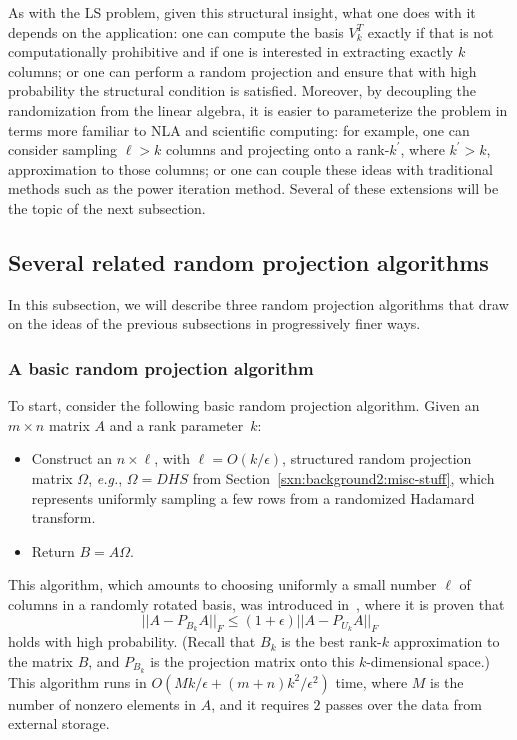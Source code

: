 \documentclass[twoside]{article}
\begin{document}
As with the LS problem, given this structural insight, what one does with 
it depends on the application:
one can compute the basis $V_k^T$ exactly if that is not computationally 
prohibitive and if one is interested in extracting exactly $k$ columns; or
one can perform a random projection and ensure that with high probability 
the structural condition is satisfied.
Moreover, by decoupling the randomization from the linear algebra, it is 
easier to parameterize the problem in terms more familiar to NLA and 
scientific computing: for example, one can consider sampling $\ell > k$ 
columns and projecting onto a rank-$k^\prime$, where $k^\prime > k$, 
approximation to those columns; or one can couple these ideas with 
traditional methods such as the power iteration method.
Several of these extensions will be the topic of the next subsection.


\subsection{Several related random projection algorithms}
\label{sxn:low-rank:proj}

In this subsection, we will describe three random projection algorithms that 
draw on the ideas of the previous subsections in progressively finer ways.

\subsubsection{A basic random projection algorithm}
\label{sxn:low-rank:proj-first}

To start, consider the following basic random projection algorithm.
Given an $m \times n$ matrix $A$ and a rank parameter~$k$:
\begin{itemize}
\item
Construct an $n \times \ell$, with $\ell =O(k/\epsilon)$, structured random 
projection matrix $\Omega$, \emph{e.g.}, $\Omega = DHS $ from 
Section~\ref{sxn:background2:misc-stuff}, which represents uniformly 
sampling a few rows from a randomized Hadamard transform.
\item
Return $B=A\Omega$.
\end{itemize}
This algorithm, which amounts to choosing uniformly a small number $\ell$ 
of columns in a randomly rotated basis, was introduced in~\cite{Sarlos06},
where it is proven that
\begin{equation}
||A-P_{B_k}A||_F \le (1+\epsilon) ||A-P_{U_k}A ||_F
\label{eqn:project-rel-err}
\end{equation}
holds with high probability.
(Recall that $B_k$ is the best rank-$k$ approximation to the matrix $B$, and 
$P_{B_k}$ is the projection matrix onto this $k$-dimensional space.)
This algorithm runs in $O(Mk/\epsilon +(m+n)k^2/\epsilon^2)$ time, where $M$
is the number of nonzero elements in $A$, and it requires $2$ passes over the
data from external storage.
\end{document}
